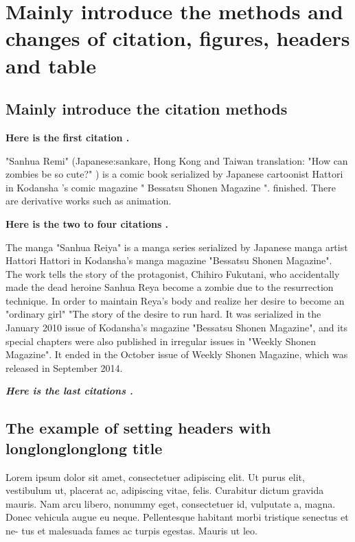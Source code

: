 \chapternumberfont{\fontsize{20pt}{20pt}\selectfont}
\chaptertitlefont{\fontsize{18pt}{18pt}\selectfont}

\chapter{Mainly introduce the methods and changes of citation, figures, headers and table}

\section{Mainly introduce the citation methods}

\textbf{Here is the first citation \cite{1_GCS2020}.}


"Sanhua Remi" (Japanese:sankare, Hong Kong and Taiwan translation: "How can zombies be so cute?" ) is a comic book serialized by Japanese cartoonist Hattori in Kodansha 's comic magazine " Bessatsu Shonen Magazine ". finished. There are derivative works such as animation. 

\textbf{Here is the two to four citations \cite{2_CA, 3_PSM, 4_HUANG2014}.}

The manga "Sanhua Reiya" is a manga series serialized by Japanese manga artist Hattori Hattori in Kodansha's manga magazine "Bessatsu Shonen Magazine". The work tells the story of the protagonist, Chihiro Fukutani, who accidentally made the dead heroine Sanhua Reya become a zombie due to the resurrection technique. In order to maintain Reya's body and realize her desire to become an "ordinary girl" "The story of the desire to run hard. It was serialized in the January 2010 issue of Kodansha's magazine "Bessatsu Shonen Magazine", and its special chapters were also published in irregular issues in "Weekly Shonen Magazine". It ended in the October issue of Weekly Shonen Magazine, which was released in September 2014.


\textbf{\textit{Here is the last citations \cite{5_Huang2020, 6_Huang2019}.}}

\section[The example of setting headers with longlonglonglong title]{The example of setting headers with longlonglonglong title%
  }

Lorem ipsum dolor sit amet, consectetuer adipiscing elit. Ut purus elit, vestibulum ut, placerat ac, adipiscing vitae, felis. Curabitur dictum gravida mauris. Nam arcu libero, nonummy eget, consectetuer id, vulputate a, magna. Donec vehicula augue eu neque. Pellentesque habitant morbi tristique senectus et ne-
tus et malesuada fames ac turpis egestas. Mauris ut leo. 

